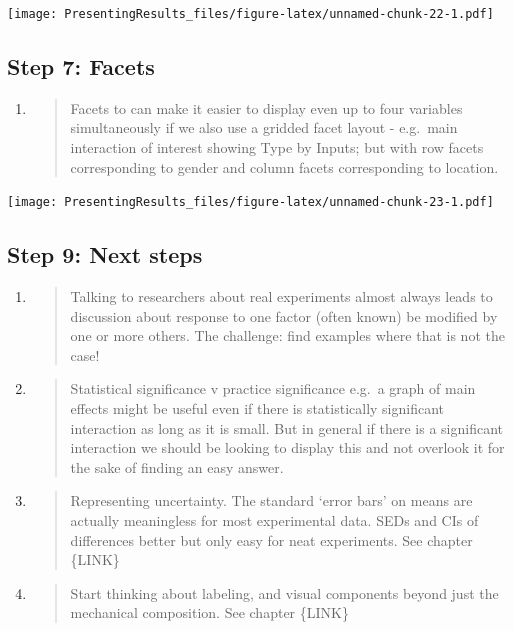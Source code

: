 \documentclass[
]{book}
\begin{document}
\texttt{[image: PresentingResults\_files/figure-latex/unnamed-chunk-22-1.pdf]}

\hypertarget{step-7-facets}{%
\subsection{Step 7: Facets}\label{step-7-facets}}

\begin{enumerate}
\def\labelenumi{\alph{enumi}.}
\item
  \begin{quote}
  Facets to can make it easier to display even up to four variables simultaneously if we also use a gridded facet layout - e.g.~main interaction of interest showing Type by Inputs; but with row facets corresponding to gender and column facets corresponding to location.
  \end{quote}
\end{enumerate}

\texttt{[image: PresentingResults\_files/figure-latex/unnamed-chunk-23-1.pdf]}

\hypertarget{step-9-next-steps}{%
\subsection{Step 9: Next steps}\label{step-9-next-steps}}

\begin{enumerate}
\def\labelenumi{\alph{enumi}.}
\item
  \begin{quote}
  Talking to researchers about real experiments almost always leads to discussion about response to one factor (often known) be modified by one or more others. The challenge: find examples where that is not the case!
  \end{quote}
\item
  \begin{quote}
  Statistical significance v practice significance e.g.~a graph of main effects might be useful even if there is statistically significant interaction as long as it is small. But in general if there is a significant interaction we should be looking to display this and not overlook it for the sake of finding an easy answer.
  \end{quote}
\item
  \begin{quote}
  Representing uncertainty. The standard `error bars' on means are actually meaningless for most experimental data. SEDs and CIs of differences better but only easy for neat experiments. See chapter \{LINK\}
  \end{quote}
\item
  \begin{quote}
  Start thinking about labeling, and visual components beyond just the mechanical composition. See chapter \{LINK\}
  \end{quote}
\end{enumerate}
\end{document}
